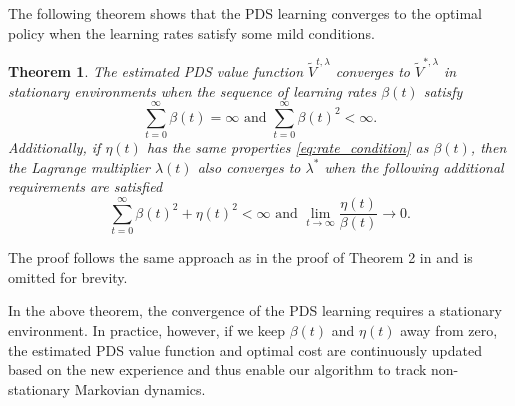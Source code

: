 \documentclass[lettersize, journal]{IEEEtran}
\newtheorem{theorem}{Theorem}
\begin{document}
The following theorem shows that the PDS learning converges to the optimal policy when the learning rates satisfy some mild conditions.
\begin{theorem}
    The estimated PDS value function $\tilde{V}^{t, \lambda}$ converges to $\tilde{V}^{*, \lambda}$ in stationary environments
    when the sequence of learning rates $\beta(t)$ satisfy
    \begin{equation}
        \sum_{t=0}^{\infty} \beta(t) = \infty \mbox{ and } \sum_{t=0}^{\infty} \beta(t)^2 < \infty.
        \label{eq:rate_condition}
    \end{equation}
    Additionally, if $\eta(t)$ has the same properties \eqref{eq:rate_condition} as $\beta(t)$,
    then the Lagrange multiplier $\lambda(t)$ also converges to $\lambda^*$ when the following additional requirements are satisfied
    \begin{equation*}
        \sum_{t=0}^{\infty} \beta(t)^2 + \eta(t)^2 < \infty \mbox{ and } \lim_{t\to\infty} \frac{\eta(t)}{\beta(t)} \to 0.
    \end{equation*}
    \label{theorem:pds_convergence}
\end{theorem}
\begin{IEEEproof}
    The proof follows the same approach as in the proof of Theorem 2 in \cite{mastronarde2012joint} and is omitted for brevity.
\end{IEEEproof}

In the above theorem, the convergence of the PDS learning requires a stationary environment.
In practice, however, if we keep $\beta(t)$ and $\eta(t)$ away from zero,
the estimated PDS value function and optimal cost are continuously updated based on the new experience
and thus enable our algorithm to track non-stationary Markovian dynamics.
\end{document}
